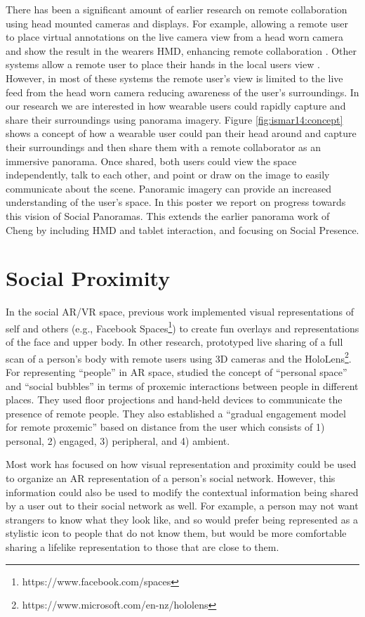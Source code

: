 There has been a significant amount of earlier research on remote collaboration using head mounted cameras and displays. For example, allowing a remote user to place virtual annotations on the live camera view from a head worn camera and show the result in the wearers HMD, enhancing remote collaboration \cite{Fussell2003}. Other systems allow a remote user to place their hands in the local users view \cite{Huang2013}. However, in most of these systems the remote user's view is limited to the live feed from the head worn camera reducing awareness of the user's surroundings. In our research we are interested in how wearable users could rapidly capture and share their surroundings using panorama imagery. Figure \ref{fig:ismar14:concept} shows a concept of how a wearable user could pan their head around and capture their surroundings and then share them with a remote collaborator as an immersive panorama. Once shared, both users could view the space independently, talk to each other, and point or draw on the image to easily communicate about the scene. Panoramic imagery can provide an increased understanding of the user's space. In this poster we report on progress towards this vision of Social Panoramas. This extends the earlier panorama work of Cheng \cite{L.Cheng1998} by including HMD and tablet interaction, and focusing on Social Presence.

\section{Social Proximity}

In the social AR/VR space, previous work implemented visual representations of self and others (e.g., Facebook Spaces\footnote{https://www.facebook.com/spaces}) to create fun overlays and representations of the face and upper body. In other research, \cite{Fanello2016} prototyped live sharing of a full scan of a person's body with remote users using 3D cameras and the HoloLens\footnote{https://www.microsoft.com/en-nz/hololens}. For representing “people” in AR space, \cite{Sousa2016} studied the concept of \enquote{personal space} and \enquote{social bubbles} in terms of proxemic interactions between people in different places. They used floor projections and hand-held devices to communicate the presence of remote people. They also established a \enquote{gradual engagement model for remote proxemic} based on distance from the user which consists of 1) personal, 2) engaged, 3) peripheral, and 4) ambient.

Most work has focused on how visual representation and proximity could be used to organize an AR representation of a person's social network. However, this information could also be used to modify the contextual information being shared by a user out to their social network as well. For example, a person may not want strangers to know what they look like, and so would prefer being represented as a stylistic icon to people that do not know them, but would be more comfortable sharing a lifelike representation to those that are close to them. 

